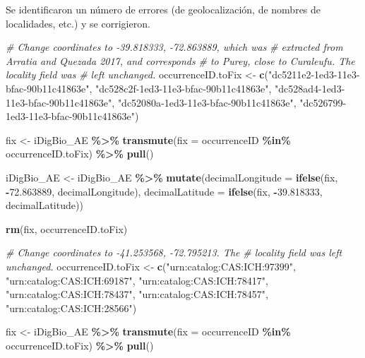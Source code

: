 \documentclass[sn-apa,pdflatex]{sn-jnl}
\newenvironment{Shaded}{\begin{snugshade}}{\end{snugshade}}
\newcommand{\AttributeTok}[1]{\textcolor[rgb]{0.13,0.29,0.53}{#1}}
\newcommand{\CommentTok}[1]{\textcolor[rgb]{0.56,0.35,0.01}{\textit{#1}}}
\newcommand{\FloatTok}[1]{\textcolor[rgb]{0.00,0.00,0.81}{#1}}
\newcommand{\FunctionTok}[1]{\textcolor[rgb]{0.13,0.29,0.53}{\textbf{#1}}}
\newcommand{\NormalTok}[1]{#1}
\newcommand{\OtherTok}[1]{\textcolor[rgb]{0.56,0.35,0.01}{#1}}
\newcommand{\SpecialCharTok}[1]{\textcolor[rgb]{0.81,0.36,0.00}{\textbf{#1}}}
\newcommand{\StringTok}[1]{\textcolor[rgb]{0.31,0.60,0.02}{#1}}
\begin{document}
Se identificaron un número de errores (de geolocalización, de nombres de
localidades, etc.) y se corrigieron.

\begin{Shaded}
\begin{Highlighting}[]
\CommentTok{\# Change coordinates to {-}39.818333, {-}72.863889, which was}
\CommentTok{\# extracted from Arratia and Quezada 2017, and corresponds}
\CommentTok{\# to Purey, close to Curaleufu. The \textquotesingle{}locality\textquotesingle{} field was}
\CommentTok{\# left unchanged.}
\NormalTok{occurrenceID.toFix }\OtherTok{\textless{}{-}} \FunctionTok{c}\NormalTok{(}\StringTok{"dc5211e2{-}1ed3{-}11e3{-}bfac{-}90b11c41863e"}\NormalTok{,}
    \StringTok{"dc528c2f{-}1ed3{-}11e3{-}bfac{-}90b11c41863e"}\NormalTok{, }\StringTok{"dc528ad4{-}1ed3{-}11e3{-}bfac{-}90b11c41863e"}\NormalTok{,}
    \StringTok{"dc52080a{-}1ed3{-}11e3{-}bfac{-}90b11c41863e"}\NormalTok{, }\StringTok{"dc526799{-}1ed3{-}11e3{-}bfac{-}90b11c41863e"}\NormalTok{)}

\NormalTok{fix }\OtherTok{\textless{}{-}}\NormalTok{ iDigBio\_AE }\SpecialCharTok{\%\textgreater{}\%}
    \FunctionTok{transmute}\NormalTok{(}\AttributeTok{fix =}\NormalTok{ occurrenceID }\SpecialCharTok{\%in\%}\NormalTok{ occurrenceID.toFix) }\SpecialCharTok{\%\textgreater{}\%}
    \FunctionTok{pull}\NormalTok{()}

\NormalTok{iDigBio\_AE }\OtherTok{\textless{}{-}}\NormalTok{ iDigBio\_AE }\SpecialCharTok{\%\textgreater{}\%}
    \FunctionTok{mutate}\NormalTok{(}\AttributeTok{decimalLongitude =} \FunctionTok{ifelse}\NormalTok{(fix, }\SpecialCharTok{{-}}\FloatTok{72.863889}\NormalTok{, decimalLongitude),}
        \AttributeTok{decimalLatitude =} \FunctionTok{ifelse}\NormalTok{(fix, }\SpecialCharTok{{-}}\FloatTok{39.818333}\NormalTok{, decimalLatitude))}

\FunctionTok{rm}\NormalTok{(fix, occurrenceID.toFix)}

\CommentTok{\# Change coordinates to {-}41.253568, {-}72.795213. The}
\CommentTok{\# \textquotesingle{}locality\textquotesingle{} field was left unchanged.}
\NormalTok{occurrenceID.toFix }\OtherTok{\textless{}{-}} \FunctionTok{c}\NormalTok{(}\StringTok{"urn:catalog:CAS:ICH:97399"}\NormalTok{, }\StringTok{"urn:catalog:CAS:ICH:69187"}\NormalTok{,}
    \StringTok{"urn:catalog:CAS:ICH:78417"}\NormalTok{, }\StringTok{"urn:catalog:CAS:ICH:78437"}\NormalTok{,}
    \StringTok{"urn:catalog:CAS:ICH:78457"}\NormalTok{, }\StringTok{"urn:catalog:CAS:ICH:28566"}\NormalTok{)}

\NormalTok{fix }\OtherTok{\textless{}{-}}\NormalTok{ iDigBio\_AE }\SpecialCharTok{\%\textgreater{}\%}
    \FunctionTok{transmute}\NormalTok{(}\AttributeTok{fix =}\NormalTok{ occurrenceID }\SpecialCharTok{\%in\%}\NormalTok{ occurrenceID.toFix) }\SpecialCharTok{\%\textgreater{}\%}
    \FunctionTok{pull}\NormalTok{()}


\end{Highlighting}
\end{Shaded}
\end{document}
